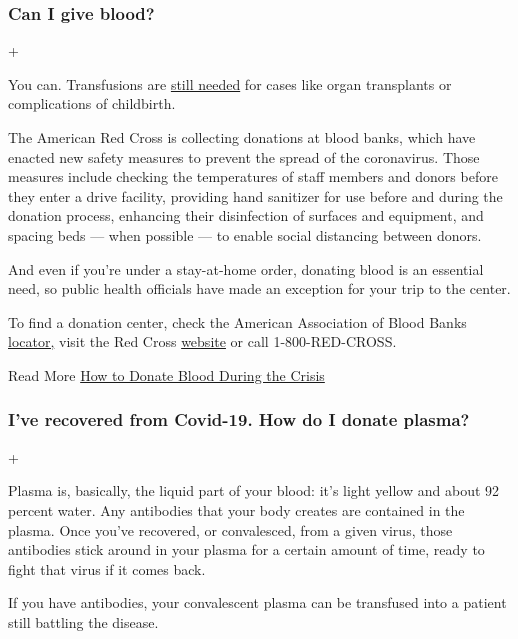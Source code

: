 \hypertarget{can-i-give-blood}{%
\subsubsection{Can I give blood?}\label{can-i-give-blood}}

+

You can. Transfusions are
\href{https://docs.google.com/document/d/1Ep_tZsoeCO6fLGDmD58CetFzaKk1uUwkAEoa_CQ1p0U/edit?ts=5f0dc4a0}{still
needed} for cases like organ transplants or complications of childbirth.

The American Red Cross is collecting donations at blood banks, which
have enacted new safety measures to prevent the spread of the
coronavirus. Those measures include checking the temperatures of staff
members and donors before they enter a drive facility, providing hand
sanitizer for use before and during the donation process, enhancing
their disinfection of surfaces and equipment, and spacing beds --- when
possible --- to enable social distancing between donors.

And even if you're under a stay-at-home order, donating blood is an
essential need, so public health officials have made an exception for
your trip to the center.

To find a donation center, check the American Association of Blood Banks
\href{http://www.aabb.org/tm/donation/Pages/Blood-Bank-Locator.aspx}{locator,}
visit the Red Cross \href{https://www.redcrossblood.org/}{website} or
call 1-800-RED-CROSS.

 Read More
\href{https://www.nytimes3xbfgragh.onion/2020/03/19/well/live/coronavirus-blood-donation.html}{How
to Donate Blood During the Crisis}

\hypertarget{ive-recovered-from-covid-19-how-do-i-donate-plasma}{%
\subsubsection{I've recovered from Covid-19. How do I donate
plasma?}\label{ive-recovered-from-covid-19-how-do-i-donate-plasma}}

+

Plasma is, basically, the liquid part of your blood: it's light yellow
and about 92 percent water. Any antibodies that your body creates are
contained in the plasma. Once you've recovered, or convalesced, from a
given virus, those antibodies stick around in your plasma for a certain
amount of time, ready to fight that virus if it comes back.

If you have antibodies, your convalescent plasma can be transfused into
a patient still battling the disease.

